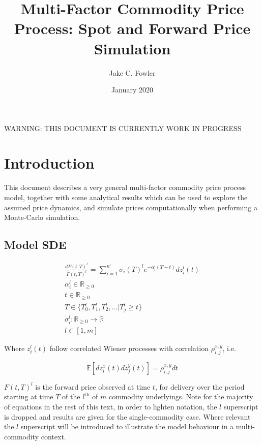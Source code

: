 \documentclass{article}
\title{Multi-Factor Commodity Price Process: Spot and Forward Price Simulation}
\author{Jake C. Fowler}
\date{January 2020}
\begin{document}
\newcommand{\+}[1]{\ensuremath{\mathbf{#1}}}

\maketitle

WARNING: THIS DOCUMENT IS CURRENTLY WORK IN PROGRESS

\tableofcontents

\section{Introduction}
This document describes a very general multi-factor commodity price process model,
together with some analytical results which can be used to explore the assumed
price dynamics, and simulate prices computationally when performing a Monte-Carlo
simulation.

\subsection{Model SDE}

\begin{align}
    \label{eq:forward_sde}
    \frac{dF(t, T)^l}{F(t, T)^l}=\sum_{i=1}^{n^l} \sigma_i(T)^le^{-\alpha_i^l(T-t)}dz_i^l(t) \\
    \nonumber
    \alpha_i^l \in \mathbb{R}_{\ge 0} \\
    \nonumber
    t \in \mathbb{R}_{\ge 0} \\
    \nonumber
    T \in \{ T_0^l, T_1^l, T_2^l, \hdots | T_j^l \ge t  \} \\
    \nonumber
    \sigma_i^l : \mathbb{R}_{\ge 0} \rightarrow \mathbb{R} \\
    \nonumber
    l \in [1, m]
\end{align}


Where $z_i^l(t)$ follow correlated Wiener processes with correlation $\rho_{i, j}^{x, y}$, i.e.

\begin{equation}
    \mathbb{E}[dz_i^x(t)dz_j^y(t)] = \rho_{i, j}^{x, y}dt
\end{equation}

$F(t, T)^l$ is the forward price observed at time $t$, for delivery over the period
starting at time $T$ of the $l^{\text{th}}$ of $m$ commodity underlyings.
Note for the majority of equations in the rest of this text, in order to lighten
notation, the $l$ superscript is dropped and results are given for the single-commodity
case. Where relevant the $l$ superscript will be introduced to illustrate the model
behaviour in a multi-commodity context.
\end{document}
